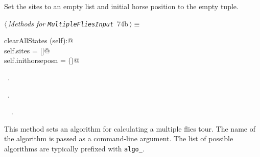 \documentclass[11.5pt]{report}
\begin{document}
\vspace{-0.8cm}
\newchunk Set the sites to an empty list and initial horse position to the empty tuple.
\begin{flushleft} \small\label{scrap110}\raggedright\small
{} $\langle\,${\itshape Methods for \verb|MultipleFliesInput|}\nobreak\ {\footnotesize {74b}}$\,\rangle\equiv$
\vspace{-1ex}
\begin{list}{}{} \item
\mbox{}\verb@def clearAllStates (self):@\\
\mbox{}\verb@   self.sites = []@\\
\mbox{}\verb@   self.inithorseposn = ()@\\
\mbox{}\verb@@{\NWsep}
\end{list}
\vspace{-1.5ex}
\footnotesize
\begin{list}{}{\setlength{\itemsep}{-\parsep}\setlength{\itemindent}{-\leftmargin}}
\item \NWtxtMacroDefBy\ .
\item \NWtxtMacroRefIn\ .
\item \NWtxtIdentsDefed\nobreak\  \verb@clearAllStates@\nobreak\ .
\item{}
\end{list}
\vspace{4ex}
\end{flushleft}


\vspace{-0.8cm} \newchunk 
This method sets an algorithm for calculating
a multiple flies tour. The name of the algorithm is passed as a command-line argument.  
The list of possible algorithms are typically prefixed with \verb|algo_|. 
          
\end{document}
